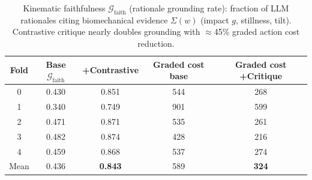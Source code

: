 \begin{table}[!t]
\centering
\caption{Kinematic faithfulness $\mathcal{G}_{\mathrm{faith}}$ (rationale grounding rate): fraction of LLM rationales citing biomechanical evidence $\Sigma(w)$ (impact $g$, stillness, tilt). Contrastive critique nearly doubles grounding with $\approx$45\% graded action cost reduction.}
\label{tab:grounding}
\begin{tabular}{ccccc}
\toprule
Fold & Base $\mathcal{G}_{\mathrm{faith}}$ & +Contrastive & Graded cost base & Graded cost +Critique \\
\midrule
0 & 0.430 & 0.851 & 544 & 268 \\
1 & 0.340 & 0.749 & 901 & 599 \\
2 & 0.471 & 0.871 & 535 & 261 \\
3 & 0.482 & 0.874 & 428 & 216 \\
4 & 0.459 & 0.868 & 537 & 274 \\
\midrule
Mean & 0.436 & \textbf{0.843} & 589 & \textbf{324} \\
\bottomrule
\end{tabular}
\end{table}
